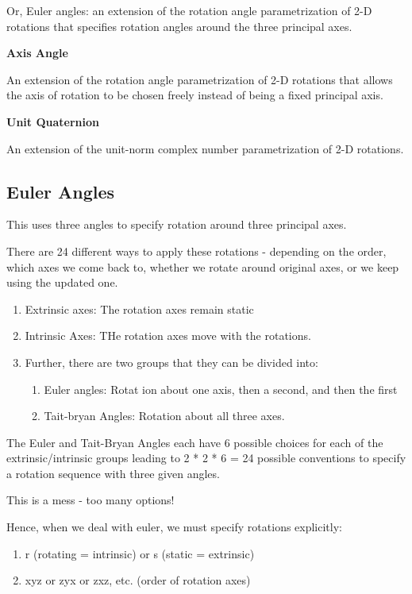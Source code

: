 Or, Euler angles: an extension of the rotation angle parametrization of 2-D rotations that specifies rotation angles around the three principal axes.

\textbf{Axis Angle}

An extension of the rotation angle parametrization of 2-D rotations that allows the axis of rotation to be chosen freely instead of being a fixed principal axis.

\textbf{Unit Quaternion}

An extension of the unit-norm complex number parametrization of 2-D rotations.

\subsection{Euler Angles}

This uses three angles to specify rotation around three principal axes.

There are 24 different ways to apply these rotations - depending on the order, which axes we come back to, whether we rotate around original axes, or we keep using the updated one.

\begin{enumerate}
    \item Extrinsic axes: The rotation axes remain static
    \item Intrinsic Axes: THe rotation axes move with the rotations.
    \item Further, there are two groups that they can be divided into:
    \begin{enumerate}
        \item Euler angles: Rotat ion about one axis, then a second, and then the first
        \item Tait-bryan Angles: Rotation about all three axes.
    \end{enumerate}
\end{enumerate}

The Euler and Tait-Bryan Angles each have 6 possible choices for each of the extrinsic/intrinsic groups leading to 2 * 2 * 6 = 24 possible conventions to specify a rotation sequence with three given angles.

This is a mess - too many options!

Hence, when we deal with euler, we must specify rotations explicitly:

\begin{enumerate}
    \item r (rotating = intrinsic) or s (static = extrinsic)
    \item xyz or zyx or zxz, etc. (order of rotation axes)
\end{enumerate}

